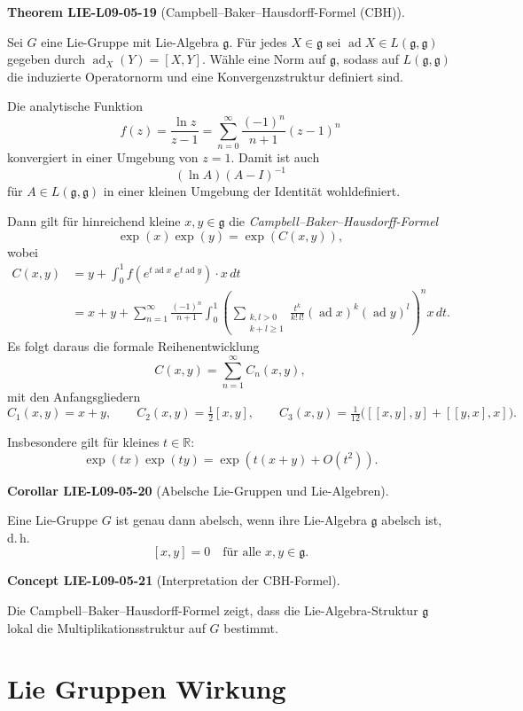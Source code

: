 \documentclass[10pt, letterpaper]{article}
\newcommand{\CustomHeading}[3]{%
  \par\medskip\noindent%
  \textbf{#1 #2} \textnormal{(#3)}.\enskip%
}
\newenvironment{THEO}[2]{\CustomHeading{Theorem}{#1}{#2}}{}
\newenvironment{KORO}[2]{\CustomHeading{Corollar}{#1}{#2}}{}
\newenvironment{CONC}[2]{\CustomHeading{Concept}{#1}{#2}}{}
\begin{document}
\begin{THEO}{LIE-L09-05-19}{Campbell--Baker--Hausdorff-Formel (CBH)}
Sei $G$ eine Lie-Gruppe mit Lie-Algebra $\mathfrak g$. Für jedes $X\in\mathfrak g$
sei $\operatorname{ad} X\in L(\mathfrak g,\mathfrak g)$ gegeben durch $\operatorname{ad}_X(Y)=[X,Y]$.
Wähle eine Norm auf $\mathfrak g$, sodass auf $L(\mathfrak g,\mathfrak g)$
die induzierte Operatornorm und eine Konvergenzstruktur definiert sind.

Die analytische Funktion
\[
f(z)=\frac{\ln z}{z-1}=\sum_{n=0}^\infty\frac{(-1)^n}{n+1}(z-1)^n
\]
konvergiert in einer Umgebung von $z=1$. Damit ist auch
\[
(\ln A)(A-I)^{-1}
\]
für $A\in L(\mathfrak g,\mathfrak g)$ in einer kleinen Umgebung der Identität wohldefiniert.

Dann gilt für hinreichend kleine $x,y\in\mathfrak g$ die \emph{Campbell--Baker--Hausdorff-Formel}
\[
\exp(x)\exp(y)=\exp(C(x,y)),
\]
wobei
\[
\begin{aligned}
C(x,y)
&=y+\int_0^1 f\!\left(e^{t\operatorname{ad} x}\,e^{t\operatorname{ad} y}\right)\cdot x\,dt\\
&=x+y+\sum_{n=1}^\infty\frac{(-1)^n}{n+1}\int_0^1
\left(\sum_{\substack{k,l>0\\k+l\ge1}}\frac{t^k}{k!\,l!}(\operatorname{ad} x)^k(\operatorname{ad} y)^l\right)^{\!n}\!x\,dt.
\end{aligned}
\]
Es folgt daraus die formale Reihenentwicklung
\[
C(x,y)=\sum_{n=1}^\infty C_n(x,y),
\]
mit den Anfangsgliedern
\[
C_1(x,y)=x+y,\qquad
C_2(x,y)=\tfrac{1}{2}[x,y],\qquad
C_3(x,y)=\tfrac{1}{12}\bigl([[x,y],y]+[[y,x],x]\bigr).
\]

Insbesondere gilt für kleines $t\in\mathbb R$:
\[
\exp(tx)\exp(ty)=\exp\!\left(t(x+y)+O(t^2)\right).
\]
\end{THEO}

\begin{KORO}{LIE-L09-05-20}{Abelsche Lie-Gruppen und Lie-Algebren}
Eine Lie-Gruppe $G$ ist genau dann abelsch, wenn ihre Lie-Algebra $\mathfrak g$
abelsch ist, d.\,h.
\[
[x,y]=0\quad\text{für alle }x,y\in\mathfrak g.
\]
\end{KORO}

\begin{CONC}{LIE-L09-05-21}{Interpretation der CBH-Formel}
Die Campbell--Baker--Hausdorff-Formel zeigt, dass die Lie-Algebra-Struktur
$\mathfrak g$ lokal die Multiplikationsstruktur auf $G$ bestimmt.
\end{CONC}

\section{Lie Gruppen Wirkung}
\end{document}
